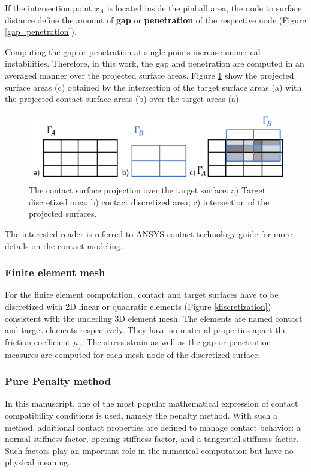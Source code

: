 If the intersection point $x_A$ is located inside the pinball area, the node to surface distance define the amount of \textbf{gap} or \textbf{penetration} of the respective node (Figure \ref{gap_penetration}).
 
Computing the gap or penetration at single points increase numerical instabilities.  Therefore, in this work, the gap and penetration are computed in an averaged manner over the projected surface areas. Figure \ref{projecte_surface} show the projected surface areas (c) obtained by the intersection of the target surface areas (a) with the projected contact surface areas (b) over the target areas (a). 

 \begin{center}
\begin{figure}
\centerline{\includegraphics[width=1\textwidth,keepaspectratio]{figures/projecte_surface.jpg} }
\caption{The contact surface projection over the target surface: a) Target discretized area; b) contact discretized area; c) intersection of the projected surfaces.}
\label{projecte_surface}
\end{figure}
\end{center}

 The interested reader is referred to ANSYS contact technology guide \citep{ansys_contact_2017} for more details on the contact modeling.


\subsubsection*{Finite element mesh}
For the finite element computation, contact and target surfaces have to be discretized with 2D linear or quadratic elements (Figure \ref{discretization}) consistent with the underling 3D element mesh. The elements are named contact and target elements respectively.  They have no material properties apart the friction coefficient $\mu_f$. The stress-strain as well as the gap or penetration measures are computed for each mesh node of the discretized surface.

\subsubsection*{Pure Penalty method}
In this manuscript, one of the most popular mathematical expression of contact compatibility conditions is used, namely the penalty method. With such a method, additional contact properties are defined to manage contact behavior: a normal stiffness factor, opening stiffness factor, and a tangential stiffness factor. Such factors play an important role in the numerical computation but have no physical meaning.

